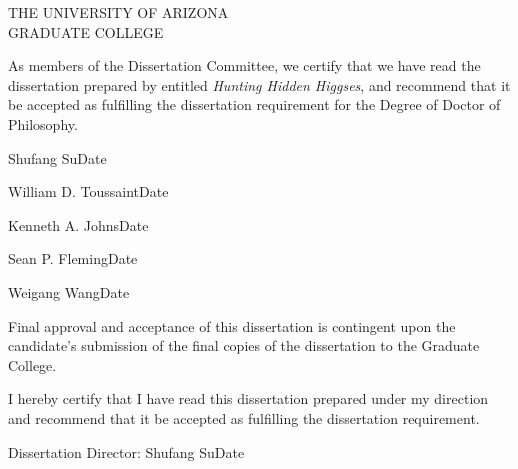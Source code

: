 \cleardoublepage
\begin{center}
  {\scshape THE UNIVERSITY OF ARIZONA\\
  GRADUATE COLLEGE}
\end{center}
As members of the Dissertation Committee, we certify that we have read the dissertation prepared by {\@author} entitled \emph{Hunting Hidden Higgses}, and recommend that it be accepted as fulfilling the dissertation requirement for the Degree of Doctor of Philosophy.
\vfill

\noindent \hrulefill

\smallskip

\noindent Shufang Su\hfill Date
\bigskip\bigskip

\noindent \hrulefill
\smallskip

\noindent William D. Toussaint\hfill Date
\bigskip\bigskip

\noindent \hrulefill
\smallskip

\noindent Kenneth A. Johns\hfill Date
\bigskip\bigskip

\noindent \hrulefill

\smallskip

\noindent Sean P. Fleming\hfill Date
\bigskip\bigskip

\noindent \hrulefill

\smallskip

\noindent Weigang Wang\hfill Date
\vfill

\noindent Final approval and acceptance of this dissertation is contingent upon the candidate’s submission of the final copies of the dissertation to the Graduate College. 

\vfill
\noindent I hereby certify that I have read this dissertation prepared under my direction and recommend that it be accepted as fulfilling the dissertation requirement.

\bigskip\bigskip
\noindent\hrulefill
\smallskip

\noindent Dissertation Director: Shufang Su\hfill Date

